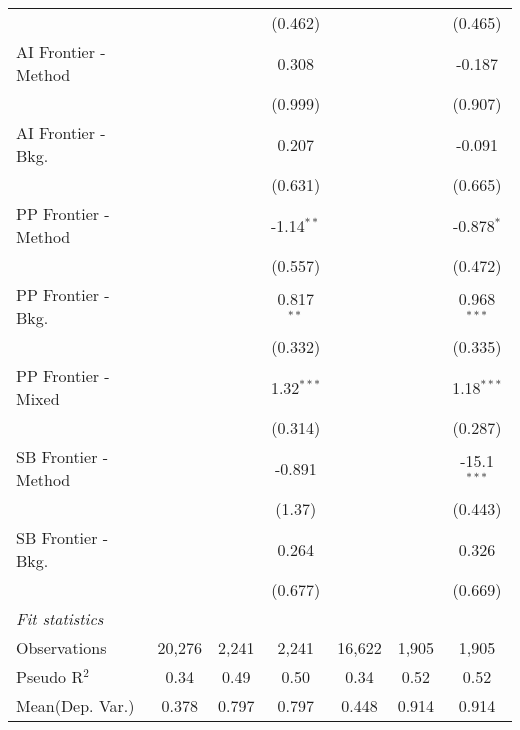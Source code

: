 \begin{tabular}{lcccccc}
                        &               &         & (0.462)      &                &             & (0.465)\\   
   AI Frontier - Method &               &         & 0.308        &                &             & -0.187\\   
                        &               &         & (0.999)      &                &             & (0.907)\\   
   AI Frontier - Bkg.   &               &         & 0.207        &                &             & -0.091\\   
                        &               &         & (0.631)      &                &             & (0.665)\\   
   PP Frontier - Method &               &         & -1.14$^{**}$ &                &             & -0.878$^{*}$\\   
                        &               &         & (0.557)      &                &             & (0.472)\\   
   PP Frontier - Bkg.   &               &         & 0.817$^{**}$ &                &             & 0.968$^{***}$\\   
                        &               &         & (0.332)      &                &             & (0.335)\\   
   PP Frontier - Mixed  &               &         & 1.32$^{***}$ &                &             & 1.18$^{***}$\\   
                        &               &         & (0.314)      &                &             & (0.287)\\   
   SB Frontier - Method &               &         & -0.891       &                &             & -15.1$^{***}$\\   
                        &               &         & (1.37)       &                &             & (0.443)\\   
   SB Frontier - Bkg.   &               &         & 0.264        &                &             & 0.326\\   
                        &               &         & (0.677)      &                &             & (0.669)\\   
   \midrule
   \emph{Fit statistics}\\
   Observations         & 20,276        & 2,241   & 2,241        & 16,622         & 1,905       & 1,905\\  
   Pseudo R$^2$         & 0.34          & 0.49    & 0.50         & 0.34           & 0.52        & 0.52\\  
Mean(Dep. Var.) & 0.378 & 0.797 & 0.797 & 0.448 & 0.914 & 0.914 \\
   

\end{tabular}
